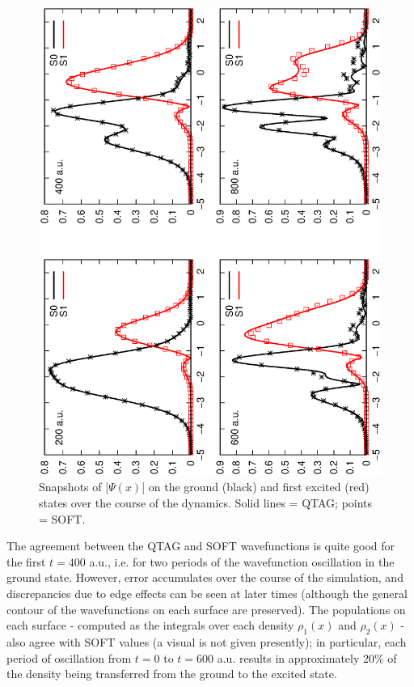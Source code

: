 \documentclass[journal=jpc]{achemso}
\begin{document}
\begin{figure}
\centering
\includegraphics[angle=-90,width=1.0\textwidth]{eps-files/wfs-25-09.eps}
\caption{Snapshots of |$\Psi(x)$| on the ground (black) and first excited (red) states over the course of the dynamics. Solid lines = QTAG; points = SOFT.}
\label{fig:wf-25}
\end{figure}
\maketitle

The agreement between the QTAG and SOFT wavefunctions is quite good for the first $t=400$ a.u., i.e. for two periods of the wavefunction oscillation in the ground state. However, error accumulates over the course of the simulation, and discrepancies due to edge effects can be seen at later times (although the general contour of the wavefunctions on each surface are preserved). The populations on each surface - computed as the integrals over each density $\rho_1(x)$ and $\rho_2(x)$ - also agree with SOFT values (a visual is not given presently); in particular, each period of oscillation from $t=0$ to $t=600$ a.u. results in approximately 20\% of the density being transferred from the ground to the excited state. 
\end{document}
